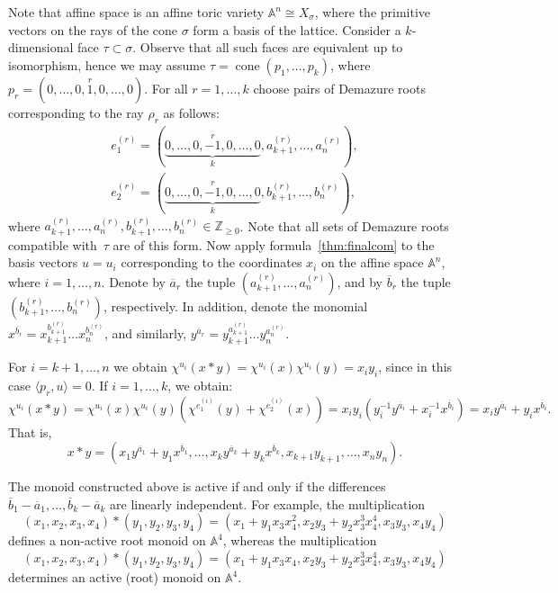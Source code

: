 \documentclass[a4paper, 11pt]{amsart}
\theoremstyle{plain}
\theoremstyle{remark}
\theoremstyle{definition}
\renewcommand{\AA}{\mathbb{A}}
\newcommand{\ZZ}{\mathbb{Z}}
\newcommand{\ol}[1]{\overline{#1}}
\DeclareMathOperator{\cone}{cone}
\begin{document}
Note that affine space is an affine toric variety $\mathbb{A}^n \cong X_\sigma$, where the primitive vectors on the rays of the cone $\sigma$ form a basis of the lattice. Consider a $k$-dimensional face $\tau \subset \sigma$. Observe that all such faces are equivalent up to isomorphism, hence we may assume $\tau = \cone(p_1, \ldots, p_k)$, where $p_r = (0, \ldots, 0, \overset{r}{1}, 0, \ldots, 0)$. For all $r = 1, \ldots, k$ choose pairs of Demazure roots corresponding to the ray $\rho_r$ as follows:
\begin{gather*}
e_1^{(r)} =  (\underbrace{0, \ldots, 0, \overset{r}{-1}, 0, \ldots, 0}_{k}, a_{k+1}^{(r)}, \ldots, a_n^{(r)}),
\\
e_2^{(r)} =  (\underbrace{0, \ldots, 0, \overset{r}{-1}, 0, \ldots, 0}_{k}, b_{k+1}^{(r)}, \ldots, b_n^{(r)}),
\end{gather*}
where $a_{k+1}^{(r)}, \ldots, a_n^{(r)}, b_{k+1}^{(r)}, \ldots, b_n^{(r)} \in \ZZ_{\geq 0}$. Note that all sets of Demazure roots compatible with~$\tau$ are of this form. Now apply formula~\eqref{thm:finalcom} to the basis vectors $u = u_i$ corresponding to the coordinates $x_i$ on the affine space $\mathbb{A}^n$, where $i = 1, \ldots, n$. Denote by $\ol{a}_r$ the tuple $(a_{k+1}^{(r)}, \ldots, a_n^{(r)})$, and by $\ol{b}_r$ the tuple $(b_{k+1}^{(r)}, \ldots, b_n^{(r)})$, respectively. In addition, denote the monomial $x^{\ol{b}_r} = x_{k+1}^{b_{k+1}^{(r)}}\ldots x_{n}^{b_{n}^{(r)}}$, and similarly, $y^{\ol{a}_r} = y_{k+1}^{a_{k+1}^{(r)}}\ldots y_{n}^{a_{n}^{(r)}}$.
	
For $i = k+1, \ldots, n$ we obtain $\chi^{u_i}(x*y) = \chi^{u_i}(x) \chi^{u_i}(y) = x_iy_i$, since in this case $\langle p_r, u \rangle = 0$. If $i = 1, \ldots, k$, we obtain: $$\chi^{u_i}(x*y) = \chi^{u_i}(x) \chi^{u_i}(y) (\chi^{e_1^{(i)}}(y) + \chi^{e_2^{(i)}}(x) ) = x_iy_i(y_i^{-1}y^{\ol{a}_i} + x_i^{-1}x^{\ol{b}_i}) = x_iy^{\ol{a}_i} + y_ix^{\ol{b}_i}.$$
That is,
$$x*y = (x_1y^{\ol{a}_1} + y_1x^{\ol{b}_1}, \ldots, x_ky^{\ol{a}_k} + y_kx^{\ol{b}_k}, x_{k+1} y_{k+1}, \ldots, x_ny_n).$$

The monoid constructed above is active if and only if the differences ${\ol{b}_1 - \ol{a}_1}, \ldots, \ol{b}_k - \ol{a}_k$ are linearly independent. For example, the multiplication
\[(x_1, x_2, x_3, x_4)*(y_1, y_2, y_3, y_4) = (x_1 + y_1x_3x_4^2, x_2y_3 + y_2x_3^3x_4^4, x_3y_3, x_4y_4)\]
defines a non-active root monoid on $\AA^4$, whereas the multiplication
\[(x_1, x_2, x_3, x_4)*(y_1, y_2, y_3, y_4) = (x_1 + y_1x_3x_4, x_2y_3 + y_2x_3^3x_4^4, x_3y_3, x_4y_4)\]
determines an active (root) monoid on $\AA^4$. 
\end{document}
